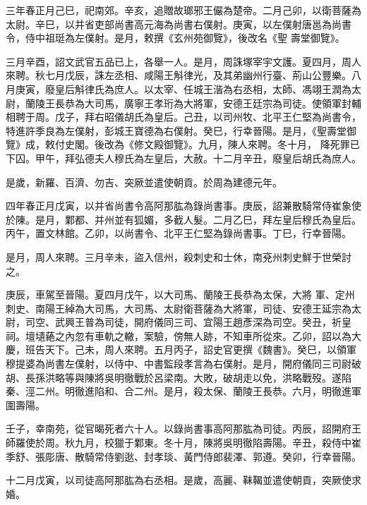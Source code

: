\begin{pinyinscope}
 三年春正月己巳，祀南郊。辛亥，追贈故瑯邪王儼為楚帝。二月己卯，以衛菩薩為太尉。辛巳，以并省吏部尚書高元海為尚書右僕射。庚寅，以左僕射唐邕為尚書令，侍中祖珽為左僕射。是月，敕撰《玄州苑御覽》，後改名《聖
 壽堂御覽》。



 三月辛酉，詔文武官五品已上，各舉一人。是月，周誅塚宰宇文護。夏四月，周人來聘。秋七月戊辰，誅左丞相、咸陽王斛律光，及其弟幽州行臺、荊山公豐樂。八月庚寅，廢皇后斛律氏為庶人。以太宰、任城王湝為右丞相，太師、馮翊王潤為太尉，蘭陵王長恭為大司馬，廣寧王孝珩為大將軍，安德王廷宗為司徒。使領軍封輔相聘于周。戊子，拜右昭儀胡氏為皇后。己丑，以司州牧、北平王仁堅為尚書令，特進許季良為左僕射，彭城王寶德為右僕射。癸巳，行幸晉陽。是月，《聖壽堂御覽》成，敕付史閣。後改為《修文殿御覽》。九月，陳人來聘。冬十月，
 降死罪已下囚。甲午，拜弘德夫人穆氏為左皇后，大赦。十二月辛丑，廢皇后胡氏為庶人。



 是歲，新羅、百濟、勿吉、突厥並遣使朝貢。於周為建德元年。



 四年春正月戊寅，以并省尚書令高阿那肱為錄尚書事。庚辰，詔兼散騎常侍崔象使於陳。是月，鄴都、并州並有狐媚，多截人髮。二月乙巳，拜左皇后穆氏為皇后。丙午，置文林館。乙卯，以尚書令、北平王仁堅為錄尚書事。丁巳，行幸晉陽。



 是月，周人來聘。三月辛未，盜入信州，殺刺史和士休，南兗州刺史鮮于世榮討之。



 庚辰，車駕至晉陽。夏四月戊午，以大司馬、蘭陵王長恭為太保，大將
 軍、定州刺史、南陽王綽為大司馬，大司馬、太尉衛菩薩為大將軍，司徒、安德王延宗為太尉，司空、武興王普為司徒，開府儀同三司、宜陽王趙彥深為司空。癸丑，祈皇祠。壇壝蕝之內忽有車軌之轍，案驗，傍無人跡，不知車所從來。乙卯，詔以為大慶，班告天下。己未，周人來聘。五月丙子，詔史官更撰《魏書》。癸巳，以領軍穆提婆為尚書左僕射，以侍中、中書監段孝言為右僕射。是月，開府儀同三司尉破胡、長孫洪略等與陳將吳明徹戰於呂梁南。大敗，破胡走以免，洪略戰歿。遂陷秦、涇二州。明徹進陷和、合二州。是月，殺太保、蘭陵王長恭。六月，明徹進軍
 圍壽陽。



 壬子，幸南苑，從官暍死者六十人。以錄尚書事高阿那肱為司徒。丙辰，詔開府王師羅使於周。秋九月，校獵于鄴東。冬十月，陳將吳明徹陷壽陽。辛丑，殺侍中崔季舒、張彫唐、散騎常侍劉逖、封孝琰、黃門侍郎裴澤、郭遵。癸卯，行幸晉陽。



 十二月戊寅，以司徒高阿那肱為右丞相。是歲，高麗、靺鞨並遣使朝貢，突厥使求婚。




\end{pinyinscope}
